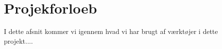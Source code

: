 \section{Projekforloeb}
I dette afsnit kommer vi igennem hvad vi har brugt af værktøjer i dette projekt....


